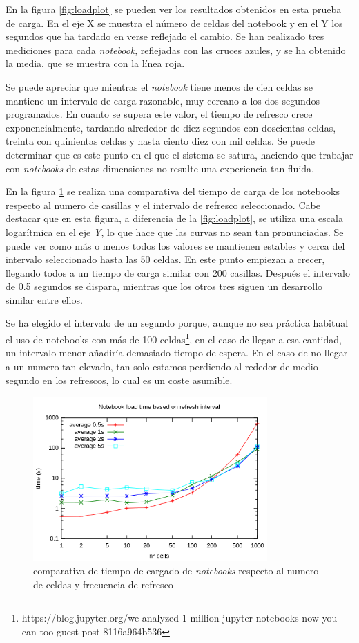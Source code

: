 \documentclass[11pt,spanish,listoffigures]{tfgetsinf}
\begin{document}
En la figura \ref{fig:loadplot} se pueden ver los resultados obtenidos en esta prueba de carga. En el eje X se muestra el número de celdas del notebook y en el Y los segundos que ha tardado en verse reflejado el cambio. Se han realizado tres mediciones para cada \textit{notebook}, reflejadas con las cruces azules, y se ha obtenido la media, que se muestra con la línea roja.

Se puede apreciar que mientras el \textit{notebook} tiene menos de cien celdas se mantiene un intervalo de carga razonable, muy cercano a los dos segundos programados. En cuanto se supera este valor, el tiempo de refresco crece exponencialmente, tardando alrededor de diez segundos con doscientas celdas, treinta con quinientas celdas y hasta ciento diez con mil celdas. Se puede determinar que es este punto en el que el sistema se satura, haciendo que trabajar con \textit{notebooks} de estas dimensiones no resulte una experiencia tan fluida.

En la figura \ref{fig:load-compare} se realiza una comparativa del tiempo de carga de los notebooks respecto al numero de casillas y el intervalo de refresco seleccionado. Cabe destacar que en esta figura, a diferencia de la \ref{fig:loadplot}, se utiliza una escala logarítmica en el eje \textit{Y}, lo que hace que las curvas no sean tan pronunciadas. Se puede ver como más o menos todos los valores se mantienen estables y cerca del intervalo seleccionado hasta las 50 celdas. En este punto empiezan a crecer, llegando todos a un tiempo de carga similar con 200 casillas. Después el intervalo de 0.5 segundos se dispara, mientras que los otros tres siguen un desarrollo similar entre ellos.

Se ha elegido el intervalo de un segundo porque, aunque no sea práctica habitual el uso de notebooks con más de 100 celdas\footnote{https://blog.jupyter.org/we-analyzed-1-million-jupyter-notebooks-now-you-can-too-guest-post-8116a964b536}, en el caso de llegar a esa cantidad, un intervalo menor añadiría demasiado tiempo de espera. En el caso de no llegar a un numero tan elevado, tan solo estamos perdiendo al rededor de medio segundo en los refrescos, lo cual es un coste asumible.

\begin{figure}[H]
	\centering
  	\includegraphics[width=0.8\textwidth]{all.png}
  	\caption{comparativa de tiempo de cargado de \textit{notebooks} respecto al numero de celdas y frecuencia de refresco}
  	\label{fig:load-compare}
\end{figure}
\end{document}
